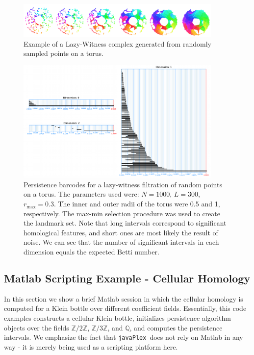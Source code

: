\documentclass{gts2012}
\newcommand\javaPlex{\texttt{javaPlex}\ }
\begin{document}
\begin{figure}
\centering
\includegraphics[width=0.9\textwidth]{images/tori_small.png}
\caption{Example of a Lazy-Witness complex generated from randomly sampled points on a torus.} \label{lwtorus}
\end{figure}

\begin{figure}
\centering
\includegraphics[width=0.9\textwidth]{images/barcodes_small.png}
\caption{Persistence barcodes for a lazy-witness filtration of random points on a torus. The parameters used were: $N = 1000$, $L = 300$, $r_{\max} = 0.3$. The inner and outer radii of the torus were 0.5 and 1, respectively. The max-min selection procedure was used to create the landmark set. Note that long intervals correspond to significant homological features, and short ones are most likely the result of noise. We can see that the number of significant intervals in each dimension equals the expected Betti number.} \label{lwtorusbarcodes}
\end{figure}

\subsection{Matlab Scripting Example - Cellular Homology}

In this section we show a brief Matlab session in which the cellular homology is computed for a Klein bottle over different coefficient fields. Essentially, this code examples constructs a cellular Klein bottle, initializes persistence algorithm objects over the fields $\mathbb{Z}/2\mathbb{Z}$, $\mathbb{Z}/3\mathbb{Z}$, and $\mathbb{Q}$, and computes the persistence intervals. We emphasize the fact that \javaPlex does not rely on Matlab in any way - it is merely being used as a scripting platform here.
\end{document}

